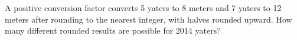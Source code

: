 A positive conversion factor converts 5 yaters to 8 meters and 7 yaters to 12 meters after rounding to the nearest integer, with halves rounded upward. How many different rounded results are possible for 2014 yaters?
